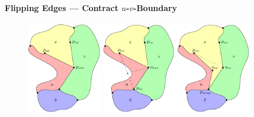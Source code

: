 \documentclass[t,18pt]{beamer}
\newcommand{\emdash}{---}
\begin{document}
\begin{frame}[c]
  \frametitle{}
  \framesubtitle{Flipping Edges \emdash{} Contract $u$-$v$-Boundary}
  \begin{figure}
    \includegraphics[width=3.25cm]{../Thesis/Resources/FlipEdge-ContractBoundaryAbove-1.pdf}
    \quad
    \includegraphics[width=3.25cm]{../Thesis/Resources/FlipEdge-ContractBoundaryAbove-2.pdf}
    \quad
    \includegraphics[width=3.25cm]{../Thesis/Resources/FlipEdge-ContractBoundaryAbove-3.pdf}
  \end{figure}
\end{frame}
\end{document}

